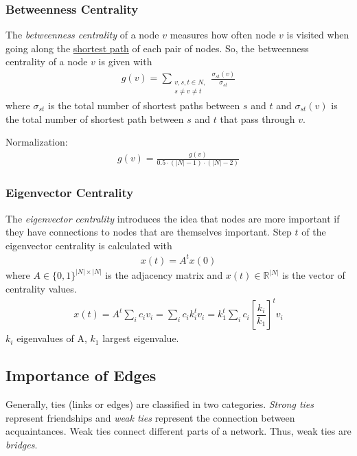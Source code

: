 \documentclass[english]{panikzettel}
\begin{document}
\subsubsection{Betweenness Centrality} \label{sec:betweenness_centrality}
The \emph{betweenness centrality} of a node $ v $ measures how often node $ v $ is visited when going along the \hyperref[sec:distance]{shortest path} of each pair of nodes.
So, the betweenness centrality of a node $ v $ is given with
\begin{align*}
	g(v) = \sum\limits_{\substack{v,s,t \in N,\\ s \neq v \neq t}} \frac{\sigma_{st}(v)}{\sigma_{st}}
\end{align*}
where $ \sigma_{st} $ is the total number of shortest paths between $ s $ and $ t $ and $ \sigma_{st}(v) $ is the total number of shortest path between $ s $ and $ t $ that pass through $ v $.

Normalization:
\begin{align*}
	g(v) = \frac{g(v)}{0.5 \cdot (|N| -1) \cdot (|N| - 2)}
\end{align*}

\subsubsection{Eigenvector Centrality}
The \emph{eigenvector centrality} introduces the idea that nodes are more important if they have connections to nodes that are themselves important.
Step $ t $ of the eigenvector centrality is calculated with
\begin{align*}
	x(t) = A^t x(0)
\end{align*}
where $ A \in \{0,1\}^{|N|\times|N|}  $ is the adjacency matrix and $ x(t) \in \mathbb{R}^{|N|} $ is the vector of centrality values.
\begin{align*}
	x(t) = A^t \sum_i c_i v_i = \sum_i c_i k_i^t v_i = k_1^t \sum_i c_i \left[\dfrac{k_i}{k_1}\right]^t v_i
\end{align*}
$ k_i $ eigenvalues of A, $ k_1 $ largest eigenvalue.


\subsection{Importance of Edges}
Generally, ties (links or edges) are classified in two categories.
\textit{Strong ties} represent friendships and \textit{weak ties} represent the connection between acquaintances.
Weak ties connect different parts of a network.
Thus, weak ties are \textit{bridges}.
\end{document}
